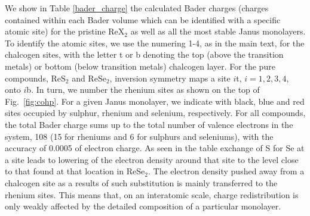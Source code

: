 \documentclass[superscriptaddress, amsmath,amssymb, preprint]{revtex4-2}
\newcounter{bla}
\begin{document}
We show in Table \ref{bader_charge} the calculated Bader charges (charges contained within each Bader volume which can be identified with a specific atomic site) for the pristine ReX$_{2}$ as well as all the most stable Janus monolayers. To identify the atomic sites, we use the numering 1-4, as in the main text, for the chalcogen sites, with the letter t or b denoting the top (above the transition metals) or bottom (below transition metals) chalcogen layer. For the pure compounds, ReS$_{2}$ and ReSe$_{2}$, inversion symmetry maps a site $i$t, $i=1,2,3,4$, onto $i$b. In turn, we number the rhenium sites as shown on the top of Fig.~\ref{fig:cohp}. For a given Janus monolayer, we indicate with black, blue and red sites occupied by sulphur, rhenium and selenium, respectively. For all compounds, the total Bader charge sums up to the total number of valence electrons in the system, 108 (15 for rheniums and 6 for sulphurs and seleniums), with the accuracy of 0.0005 of electron charge. As seen in the table exchange of S for Se at a site leads to lowering of the electron density around that site to the level close to that found at that location in ReSe$_{2}$. The electron density pushed away from a chalcogen site as a results of such substitution is mainly transferred to the rhenium sites. This means that, on an interatomic scale, charge redistribution is only weakly affected by the detailed composition of a particular monolayer. 
 
\end{document}

